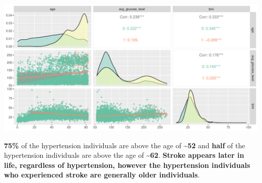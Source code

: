 \documentclass[
]{article}
\begin{document}
\includegraphics{Build-deploy-stroke-prediction-model-R_files/figure-latex/pairwise-plot-1.pdf}

\textbf{75\%} of the hypertension individuals are above the age of
\textbf{\textasciitilde52} and \textbf{half} of the hypertension
individuals are above the age of \textbf{\textasciitilde62}.
\textbf{Stroke appears later in life, regardless of hypertension,
however the hypertension individuals who experienced stroke are
generally older individuals}.
\end{document}
